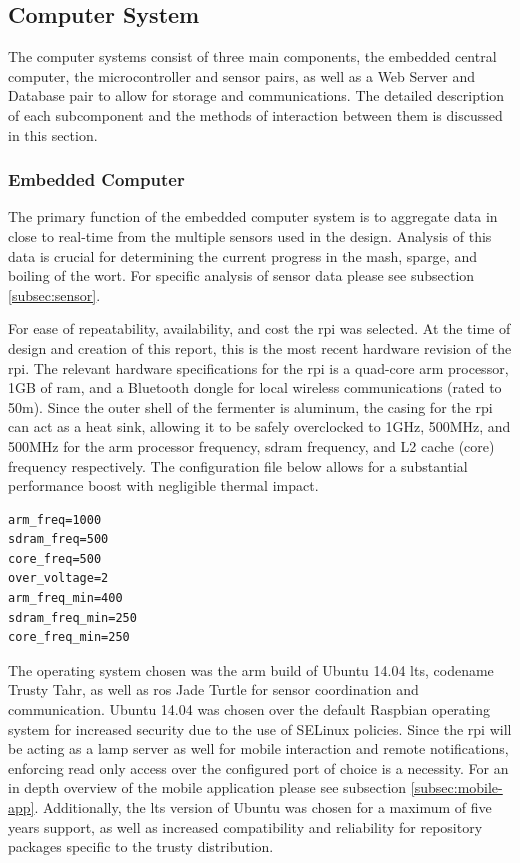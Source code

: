 \documentclass{article}
\begin{document}
\subsection{Computer System}
The computer systems consist of three main components, the embedded central computer, the microcontroller and sensor pairs, as well as a Web Server and Database pair to allow for storage and communications.  The detailed description of each subcomponent and the methods of interaction between them is discussed in this section.
\subsubsection{Embedded Computer}
The primary function of the embedded computer system is to aggregate data in close to real-time from the multiple sensors used in the design.  Analysis of this data is crucial for determining the current progress in the \gls{mash}, \gls{sparge}, and boiling of the \gls{wort}.  For specific analysis of sensor data please see subsection \ref{subsec:sensor}.

For ease of repeatability, availability, and cost the \gls{rpi} was selected.  At the time of design and creation of this report, this is the most recent hardware revision of the \gls{rpi}.  The relevant hardware specifications for the \gls{rpi} is a quad-core \gls{arm} processor, 1GB of \gls{ram}, and a Bluetooth dongle for local wireless communications (rated to 50m).  Since the outer shell of the fermenter is aluminum, the casing for the \gls{rpi} can act as a heat sink, allowing it to be safely overclocked to 1GHz, 500MHz, and 500MHz for the \gls{arm} processor frequency, sdram frequency, and L2 cache (core) frequency respectively.  The configuration file below allows for a substantial performance boost with negligible thermal impact.  

\begin{lstlisting}
arm_freq=1000
sdram_freq=500
core_freq=500
over_voltage=2
arm_freq_min=400
sdram_freq_min=250
core_freq_min=250
\end{lstlisting}

The operating system chosen was the \gls{arm} build of Ubuntu 14.04 \gls{lts}, codename Trusty Tahr, as well as \gls{ros} Jade Turtle for sensor coordination and communication.  Ubuntu 14.04 was chosen over the default Raspbian operating system for increased security due to the use of SELinux policies.  Since the \gls{rpi} will be acting as a \gls{lamp} server as well for mobile interaction and remote notifications, enforcing read only access over the configured port of choice is a necessity. For an in depth overview of the mobile application please see subsection \ref{subsec:mobile-app}.  Additionally, the \gls{lts} version of Ubuntu was chosen for a maximum of five years support, as well as increased compatibility and reliability for repository packages specific to the trusty distribution.
\end{document}
